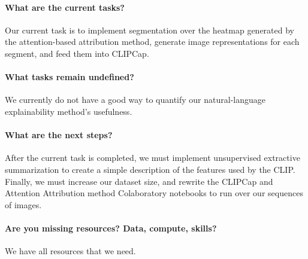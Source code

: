 \paragraph{What are the current tasks?}
Our current task is to implement segmentation over the heatmap generated by the attention-based attribution method, generate image representations for each segment, and feed them into CLIPCap.

\paragraph{What tasks remain undefined?}
We currently do not have a good way to quantify our natural-language explainability method's usefulness.

\paragraph{What are the next steps?}
After the current task is completed, we must implement unsupervised extractive summarization to create a simple description of the features used by the CLIP. Finally, we must increase our dataset size, and rewrite the CLIPCap and Attention Attribution method Colaboratory notebooks to run over our sequences of images.

\paragraph{Are you missing resources? Data, compute, skills?}
We have all resources that we need.

